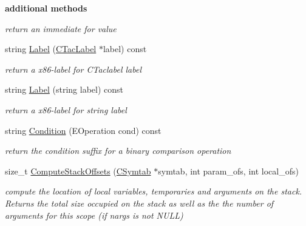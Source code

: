 \begin{Indent}{\bf additional methods}
\begin{DoxyCompactItemize}
\begin{DoxyCompactList}\small\item\em return an immediate for {\itshape value} \end{DoxyCompactList}\item 
\hypertarget{classCBackendx86_a802221dd1ccef7c2a5d3ae3de96766e3}{string \hyperlink{classCBackendx86_a802221dd1ccef7c2a5d3ae3de96766e3}{Label} (\hyperlink{classCTacLabel}{C\-Tac\-Label} $\ast$label) const }\label{classCBackendx86_a802221dd1ccef7c2a5d3ae3de96766e3}

\begin{DoxyCompactList}\small\item\em return a x86-\/label for C\-Taclabel {\itshape label} \end{DoxyCompactList}\item 
\hypertarget{classCBackendx86_ab649aa760b4fdde7c8fed1bf0e91b8bb}{string \hyperlink{classCBackendx86_ab649aa760b4fdde7c8fed1bf0e91b8bb}{Label} (string label) const }\label{classCBackendx86_ab649aa760b4fdde7c8fed1bf0e91b8bb}

\begin{DoxyCompactList}\small\item\em return a x86-\/label for string {\itshape label} \end{DoxyCompactList}\item 
\hypertarget{classCBackendx86_a44dd9b997f350c02bb355cac52ce9284}{string \hyperlink{classCBackendx86_a44dd9b997f350c02bb355cac52ce9284}{Condition} (E\-Operation cond) const }\label{classCBackendx86_a44dd9b997f350c02bb355cac52ce9284}

\begin{DoxyCompactList}\small\item\em return the condition suffix for a binary comparison operation \end{DoxyCompactList}\item 
size\-\_\-t \hyperlink{classCBackendx86_af21f8e9e88307efeb0547c3ceaf078af}{Compute\-Stack\-Offsets} (\hyperlink{classCSymtab}{C\-Symtab} $\ast$symtab, int param\-\_\-ofs, int local\-\_\-ofs)
\begin{DoxyCompactList}\small\item\em compute the location of local variables, temporaries and arguments on the stack. Returns the total size occupied on the stack as well as the the number of arguments for this scope (if {\itshape nargs} is not N\-U\-L\-L) \end{DoxyCompactList}\end{DoxyCompactItemize}
\end{Indent}
